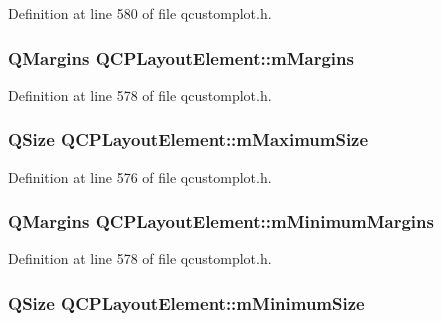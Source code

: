 Definition at line 580 of file qcustomplot.\-h.

\hypertarget{class_q_c_p_layout_element_ac2a32b99ee527ca5dfff9da03628fe94}{
\subsubsection[{m\-Margins}]{\setlength{\rightskip}{0pt plus 5cm}Q\-Margins Q\-C\-P\-Layout\-Element\-::m\-Margins\hspace{0.3cm}{\ttfamily [protected]}}}\label{class_q_c_p_layout_element_ac2a32b99ee527ca5dfff9da03628fe94}


Definition at line 578 of file qcustomplot.\-h.

\hypertarget{class_q_c_p_layout_element_a64a387973fd4addac842028c89088998}{
\subsubsection[{m\-Maximum\-Size}]{\setlength{\rightskip}{0pt plus 5cm}Q\-Size Q\-C\-P\-Layout\-Element\-::m\-Maximum\-Size\hspace{0.3cm}{\ttfamily [protected]}}}\label{class_q_c_p_layout_element_a64a387973fd4addac842028c89088998}


Definition at line 576 of file qcustomplot.\-h.

\hypertarget{class_q_c_p_layout_element_a5ba71f25d1af4bb092b28df618538e63}{
\subsubsection[{m\-Minimum\-Margins}]{\setlength{\rightskip}{0pt plus 5cm}Q\-Margins Q\-C\-P\-Layout\-Element\-::m\-Minimum\-Margins\hspace{0.3cm}{\ttfamily [protected]}}}\label{class_q_c_p_layout_element_a5ba71f25d1af4bb092b28df618538e63}


Definition at line 578 of file qcustomplot.\-h.

\hypertarget{class_q_c_p_layout_element_affef747c81632de33f08483b7fd10d01}{
\subsubsection[{m\-Minimum\-Size}]{\setlength{\rightskip}{0pt plus 5cm}Q\-Size Q\-C\-P\-Layout\-Element\-::m\-Minimum\-Size\hspace{0.3cm}{\ttfamily [protected]}}}\label{class_q_c_p_layout_element_affef747c81632de33f08483b7fd10d01}


